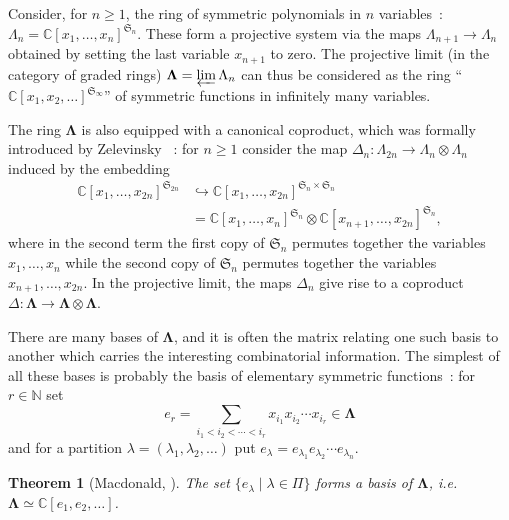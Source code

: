 \documentclass[a4paper,10pt]{amsart}
\def\N{\mathbb{N}}
\def\C{\mathbb{C}}
\def\LLambda{\boldsymbol{\Lambda}}
\newtheorem{theo}{\bf{Theorem}}[section]
\numberwithin{equation}{section}
\begin{document}
Consider, for $n \geq 1$, the ring of symmetric polynomials in $n$ variables~: $\Lambda_n=\C[x_1, \ldots, x_n]^{\mathfrak{S}_n}$. These form a projective system via the maps $\Lambda_{n+1} \to \Lambda_n$ obtained by setting the last variable $x_{n+1}$ to zero. The projective limit (in the category of graded rings) $\LLambda=\varprojlim \Lambda_n$ can thus be considered as the ring ``$\C[x_1, x_2, \ldots ]^{\mathfrak{S}_{\infty}}$'' of symmetric functions in infinitely many variables.

The ring $\LLambda$ is also equipped with a canonical coproduct, which was formally introduced by Zelevinsky \cite{Zelevinsky} ~: for $n \geq 1$ consider the map $\Delta_{n}: \Lambda_{2n} \to \Lambda_n \otimes \Lambda_n$ induced by the embedding
\begin{equation*}
\begin{split}
\C[x_1, \ldots, x_{2n}]^{\mathfrak{S}_{2n}} &\hookrightarrow \C[x_1, \ldots, x_{2n}]^{\mathfrak{S}_{n}\times \mathfrak{S}_n}\\
&= \C[x_1, \ldots, x_{n}]^{\mathfrak{S}_n} \otimes \C[x_{n+1}, \ldots ,x_{2n}]^{\mathfrak{S}_n},
\end{split}
\end{equation*}
where in the second term the first copy of $\mathfrak{S}_n$ permutes together the variables $x_1, \ldots, x_n$ while the second copy of $\mathfrak{S}_n$ permutes together the variables $x_{n+1}, \ldots, x_{2n}$. In the projective limit, the maps $\Delta_n$ give rise to a coproduct $\Delta: \LLambda \to \LLambda \otimes \LLambda$.

\vspace{.1in}

There are many bases of $\LLambda$, and it is often the matrix relating one such basis to another which carries the interesting combinatorial information. The simplest of all these bases is probably the basis of elementary symmetric functions~: for $r \in \N$ set
$$e_r=\sum_{i_1 < i_2 < \cdots < i_r} x_{i_1} x_{i_2} \cdots x_{i_r} \in \LLambda$$
and for a partition $\lambda=(\lambda_1, \lambda_2, \ldots)$ put $e_{\lambda}=e_{\lambda_1} e_{\lambda_2} \cdots e_{\lambda_n}$.

\vspace{.1in}

\begin{theo}[Macdonald, \cite{Mac}] The set $\{e_{\lambda}\;|\; \lambda \in \Pi\}$ forms a basis of $\LLambda$, i.e. $\LLambda \simeq \C[e_1, e_2, \ldots]$.\end{theo}
\end{document}
